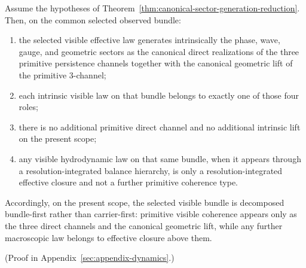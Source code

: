 \begin{theorem}
\label{thm:scoped-bundle-first-coherence-decomposition}
Assume the hypotheses of
Theorem~\ref{thm:canonical-sector-generation-reduction}. Then, on the common
selected observed bundle:
\begin{enumerate}[label=(\roman*), leftmargin=2em, itemsep=0.2em]
\item the selected visible effective law generates intrinsically the phase,
      wave, gauge, and geometric sectors as the canonical direct realizations
      of the three primitive persistence channels together with the canonical
      geometric lift of the primitive \(3\)-channel;
\item each intrinsic visible law on that bundle belongs to exactly
      one of those four roles;
\item there is no additional primitive direct channel and no additional
      intrinsic lift on the present scope;
\item any visible hydrodynamic law on that same bundle, when it appears
      through a resolution-integrated balance hierarchy, is only a
      resolution-integrated effective closure and not a further primitive
      coherence type.
\end{enumerate}
Accordingly, on the present scope, the selected visible bundle is
decomposed bundle-first rather than carrier-first: primitive visible coherence
appears only as the three direct channels and the canonical geometric lift,
while any further macroscopic law belongs to effective closure above them.
\end{theorem}

(Proof in Appendix~\ref{sec:appendix-dynamics}.)

